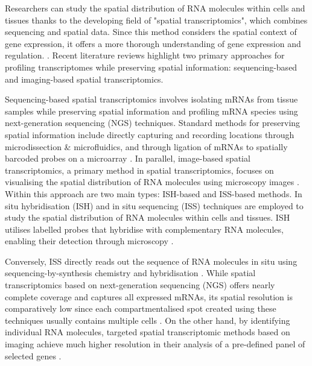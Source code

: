\documentclass[10pt,letterpaper]{article}
\begin{document}
\noindent Researchers can study the spatial distribution of RNA molecules within cells and tissues thanks to the developing field of "spatial transcriptomics", which combines sequencing and spatial data. Since this method considers the spatial context of gene expression, it offers a more thorough understanding of gene expression and regulation. \parencite{moor-2017}. Recent literature reviews \parencite{williams-2022}\parencite{moses-2022} highlight two primary approaches for profiling transcriptomes while preserving spatial information: sequencing-based and imaging-based spatial transcriptomics.  

\noindent Sequencing-based spatial transcriptomics involves isolating mRNAs from tissue samples while preserving spatial information and profiling mRNA species using next-generation sequencing (NGS) techniques. Standard methods for preserving spatial information include directly capturing and recording locations through microdissection \& microfluidics, and through ligation of mRNAs to spatially barcoded probes on a microarray \parencite{moses-2022}. In parallel, image-based spatial transcriptomics, a primary method in spatial transcriptomics, focuses on visualising the spatial distribution of RNA molecules using microscopy images \parencite{williams-2022}\parencite{levsky-2002}. Within this approach are two main types: ISH-based and ISS-based methods. In situ hybridisation (ISH) and in situ sequencing (ISS) techniques are employed to study the spatial distribution of RNA molecules within cells and tissues. ISH utilises labelled probes that hybridise with complementary RNA molecules, enabling their detection through microscopy \parencite{williams-2022}.

\noindent Conversely, ISS directly reads out the sequence of RNA molecules in situ using sequencing-by-synthesis chemistry \parencite{ke-2013}\parencite{tang-2023} and hybridisation \parencite{gyllborg-2020}. While spatial transcriptomics based on next-generation sequencing (NGS) offers nearly complete coverage and captures all expressed mRNAs, its spatial resolution is comparatively low since each compartmentalised spot created using these techniques usually contains multiple cells \parencite{stahl-2016}. On the other hand, by identifying individual RNA molecules, targeted spatial transcriptomic methods based on imaging achieve much higher resolution in their analysis of a pre-defined panel of selected genes \parencite{wang-2021}\parencite{le-2022}.
\end{document}
